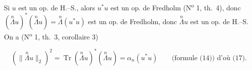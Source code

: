 
Si $u$ est un op. de H.--S., alors $u^*u$ est un op. de Fredholm (N\textsuperscript{o} 1, th.~4), donc $(\overset{n}{\Lambda}u)^*(\overset{n}{\Lambda}u)=\overset{n}{\Lambda}(u^*u)$ est un op. de Fredholm,  donc $\overset{n}{\Lambda}u$ est un op. de H.--S. On a (N\textsuperscript{o} 1, th.~3, corollaire 3)

\[
(\lVert\overset{n}{\Lambda}u\rVert_2)^2=\operatorname{Tr}(\overset{n}{\Lambda}u)^*(\overset{n}{\Lambda}u)=\alpha_n(u^*u)\qquad\text{(formule (14)) d'où (17)}.
\]
